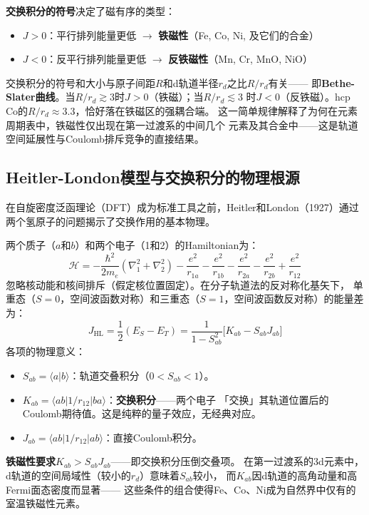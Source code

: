 \documentclass[11pt,a4paper,openany]{book}
\theoremstyle{definition}
\theoremstyle{plain}
\theoremstyle{remark}
\begin{document}
\textbf{交换积分的符号}决定了磁有序的类型：
\begin{itemize}
  \item $J > 0$：平行排列能量更低 $\to$ \textbf{铁磁性}（Fe, Co, Ni, 及它们的合金）
  \item $J < 0$：反平行排列能量更低 $\to$ \textbf{反铁磁性}（Mn, Cr, MnO, NiO）
\end{itemize}

交换积分的符号和大小与原子间距$R$和d轨道半径$r_d$之比$R/r_d$有关——
即\textbf{Bethe-Slater曲线}。当$R/r_d \gtrsim 3$时$J > 0$（铁磁）；当$R/r_d \lesssim 3$
时$J < 0$（反铁磁）。hcp Co的$R/r_d \approx 3.3$，恰好落在铁磁区的强耦合端。
这一简单规律解释了为何在元素周期表中，铁磁性仅出现在第一过渡系的中间几个
元素及其合金中——这是轨道空间延展性与Coulomb排斥竞争的直接结果。

\subsection{Heitler-London模型与交换积分的物理根源}

在自旋密度泛函理论（DFT）成为标准工具之前，Heitler和London（1927）通过
两个氢原子的问题揭示了交换作用的基本物理。

两个质子（$a$和$b$）和两个电子（1和2）的Hamiltonian为：
\begin{equation}
  \mathcal{H} = -\frac{\hbar^2}{2m_e}(\nabla_1^2 + \nabla_2^2)
  - \frac{e^2}{r_{1a}} - \frac{e^2}{r_{1b}} - \frac{e^2}{r_{2a}} - \frac{e^2}{r_{2b}}
  + \frac{e^2}{r_{12}}
\end{equation}
忽略核动能和核间排斥（假定核位置固定）。在分子轨道法的反对称化基矢下，
单重态（$S=0$，空间波函数对称）和三重态（$S=1$，空间波函数反对称）的能量差为：
\begin{equation}\label{eq:heitler-london}
  J_{\text{HL}} = \frac{1}{2}(E_S - E_T)
  = \frac{1}{1 - S_{ab}^2}\bigl[ K_{ab} - S_{ab} J_{ab} \bigr]
\end{equation}
各项的物理意义：
\begin{itemize}
  \item $S_{ab} = \langle a|b \rangle$：轨道交叠积分（$0 < S_{ab} < 1$）。
  \item $K_{ab} = \langle ab|1/r_{12}|ba \rangle$：\textbf{交换积分}——两个电子
  「交换」其轨道位置后的Coulomb期待值。这是纯粹的量子效应，无经典对应。
  \item $J_{ab} = \langle ab|1/r_{12}|ab \rangle$：直接Coulomb积分。
\end{itemize}

\textbf{铁磁性要求$K_{ab} > S_{ab}J_{ab}$}——即交换积分压倒交叠项。
在第一过渡系的3d元素中，d轨道的空间局域性（较小的$r_d$）意味着$S_{ab}$较小，
而$K_{ab}$因d轨道的高角动量和高Fermi面态密度而显著——
这些条件的组合使得Fe、Co、Ni成为自然界中仅有的室温铁磁性元素。
\end{document}
